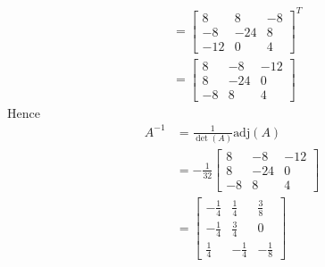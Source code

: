 \begin{Answer}
\begin{enumerate}[label=(\alph*)]
\begin{align*}
&=
\begin{bmatrix}
8 & 8 & -8 \\
-8 & -24 & 8 \\
-12 & 0 & 4
\end{bmatrix}^T \\
&=
\begin{bmatrix}
8 & -8 & -12 \\
8 & -24 & 0 \\
-8 & 8 & 4
\end{bmatrix}   
\end{align*}
Hence 
\begin{align*}
A^{-1} &= \frac{1}{\det(A)} \text{adj}(A) \\
&= -\frac{1}{32}
\begin{bmatrix}
8 & -8 & -12 \\
8 & -24 & 0 \\
-8 & 8 & 4
\end{bmatrix} \\
&= 
\begin{bmatrix}
-\frac{1}{4} & \frac{1}{4} & \frac{3}{8} \\
-\frac{1}{4} & \frac{3}{4} & 0 \\
\frac{1}{4} & -\frac{1}{4} & -\frac{1}{8}
\end{bmatrix}
\end{align*}
\end{enumerate}
\end{Answer}

